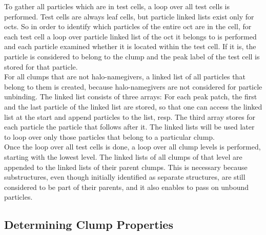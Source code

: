 To gather all particles which are in test cells, a loop over all test cells is performed.
Test cells are always leaf cells, but particle linked lists exist only for octs.
So in order to identify which particles of the entire oct are in the cell, for each test cell a loop over particle linked list of the oct it belongs to is performed and each particle examined whether it is located within the test cell. 
If it is, the particle is considered to belong to the clump and the peak label of the test cell is stored for that particle.\\
For all clumps that are not halo-namegivers, a linked list of all particles that belong to them is created, because halo-namegivers are not considered for particle unbinding.
The linked list consists of three arrays: 
For each peak patch, the first and the last particle of the linked list are stored, so that one can access the linked list at the start and append particles to the list, resp.
The third array stores for each particle the particle that follows after it.
The linked lists will be used later to loop over only those particles that belong to a particular clump.\\
Once the loop over all test cells is done, a loop over all clump levels is performed, starting with the lowest level.
The linked lists of all clumps of that level are appended to the linked lists of their parent clumps.
This is necessary because substructures, even though initially identified as separate structures, are still considered to be part of their parents, and it also enables to pass on unbound particles.










\subsection{Determining Clump Properties}

